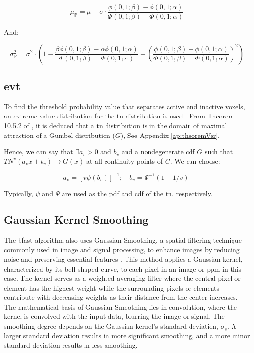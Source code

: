 \begin{equation} \label{eq:mu_P}
\mu_{\bm{\mathbb{P}}} = \overline{\mu} - \overline{\sigma} \cdot \frac{\phi(0,1;\beta)-\phi(0,1;\alpha)}{\Phi(0,1;\beta)-\Phi(0,1;\alpha)}
\end{equation}

And:

\begin{equation} \label{eq:sigma_P}
\sigma^2_{\bm{\mathbb{P}}} = \overline{\sigma}^2 \cdot \left( 1 - \frac{\beta \phi(0,1;\beta)- \alpha \phi(0,1;\alpha)}{\Phi(0,1;\beta)-\Phi(0,1;\alpha)} - \left( \frac{\phi(0,1;\beta)-\phi(0,1;\alpha)}{\Phi(0,1;\beta)-\Phi(0,1;\alpha)} \right)^2 \right)
\end{equation}

\subsection{\gls{evt}}

To find the threshold probability value that separates active and inactive voxels, an extreme value distribution for the \gls{tn} distribution is used \cite{burkardt2014truncated, nadarajah2004beta}. From Theorem 10.5.2 of \cite{david2004order}, it is deduced that a \gls{tn} distribution is in the domain of maximal attraction of a Gumbel distribution ($G$), See Appendix \ref{ap:theoremVer}.

Hence, we can say that $\exists a_v>0$ and $b_v$ and a nondegenerate \gls{cdf} $G$ such that $TN^v(a_vx+b_v) \rightarrow G(x)$ at all continuity points of $G$. We can choose:

\begin{equation}
a_v = \left[ v\psi(b_v) \right]^{-1}; \quad b_v = \Psi^{-1}(1-1/v).
\label{eq:av_bv}
\end{equation}

Typically, $\psi$ and $\Psi$ are used as the \gls{pdf} and \gls{cdf} of the \gls{tn}, respectively.

\subsection{Gaussian Kernel Smoothing}

The \gls{bfast} algorithm also uses Gaussian Smoothing, a spatial filtering technique commonly used in image and signal processing, to enhance images by reducing noise and preserving essential features \cite{garg2016quality}. This method applies a Gaussian kernel, characterized by its bell-shaped curve, to each pixel in an image or \gls{ppm} in this case. The kernel serves as a weighted averaging filter where the central pixel or element has the highest weight while the surrounding pixels or elements contribute with decreasing weights as their distance from the center increases. The mathematical basis of Gaussian Smoothing lies in convolution, where the kernel is convolved with the input data, blurring the image or signal. The smoothing degree depends on the Gaussian kernel's standard deviation, $\sigma_s$. A larger standard deviation results in more significant smoothing, and a more minor standard deviation results in less smoothing.

